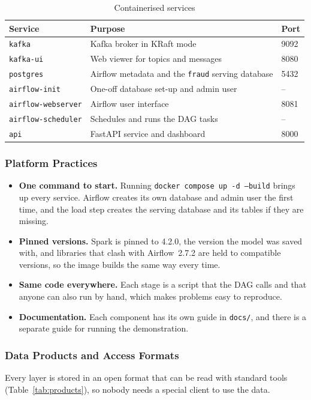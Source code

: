 \documentclass[11pt,a4paper]{article}
\newcommand{\code}[1]{\texttt{#1}}
\begin{document}
\begin{table}[H]
\centering
\caption{Containerised services}
\label{tab:services}
\begin{tabularx}{\linewidth}{lLl}
\toprule
Service & Purpose & Port \\
\midrule
\code{kafka} & Kafka broker in KRaft mode & 9092 \\
\code{kafka-ui} & Web viewer for topics and messages & 8080 \\
\code{postgres} & Airflow metadata and the \code{fraud} serving database & 5432 \\
\code{airflow-init} & One-off database set-up and admin user & -- \\
\code{airflow-webserver} & Airflow user interface & 8081 \\
\code{airflow-scheduler} & Schedules and runs the DAG tasks & -- \\
\code{api} & FastAPI service and dashboard & 8000 \\
\bottomrule
\end{tabularx}
\end{table}

\subsubsection{Platform Practices}
\begin{itemize}
  \item \textbf{One command to start.} Running \code{docker compose up -d --build}
        brings up every service. Airflow creates its own database and admin user
        the first time, and the load step creates the serving database and its
        tables if they are missing.
  \item \textbf{Pinned versions.} Spark is pinned to 4.2.0, the version the model
        was saved with, and libraries that clash with Airflow~2.7.2 are held to
        compatible versions, so the image builds the same way every time.
  \item \textbf{Same code everywhere.} Each stage is a script that the DAG calls
        and that anyone can also run by hand, which makes problems easy to
        reproduce.
  \item \textbf{Documentation.} Each component has its own guide in \code{docs/},
        and there is a separate guide for running the demonstration.
\end{itemize}

\subsubsection{Data Products and Access Formats}
Every layer is stored in an open format that can be read with standard tools
(Table~\ref{tab:products}), so nobody needs a special client to use the data.
\end{document}
